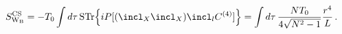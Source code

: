 \begin{equation}
S^{\rm CS}_{\rm W_B}=-T_0\int d\tau\, {\rm STr}\Bigl\{ iP[(\incl_X\incl_X)\incl_l C^{(4)}]\Bigr\}=
\int d\tau\, \frac{NT_0}{4\sqrt{N^2-1}}\frac{r^4}{L}\, .
\end{equation}

